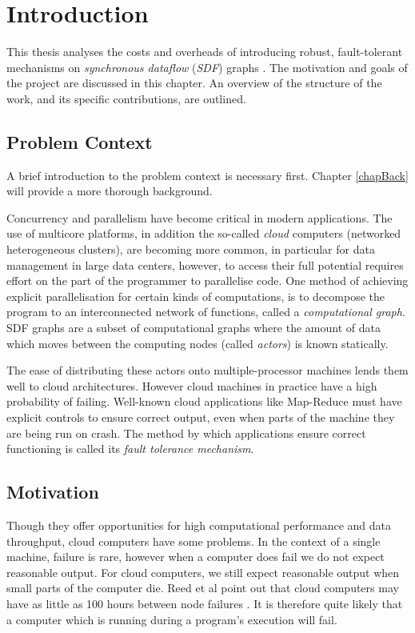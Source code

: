 \chapter{Introduction}

This thesis analyses the costs and overheads of introducing robust, fault-tolerant mechanisms on {\em synchronous dataflow} ({\em SDF}) graphs \cite{sdfBook}.
The motivation and goals of the project are discussed in this chapter.
An overview of the structure of the work, and its specific contributions, are outlined.

\section{Problem Context}

A brief introduction to the problem context is necessary first.
Chapter \ref{chapBack} will provide a more thorough background.

Concurrency and parallelism have become critical in modern applications.
The use of multicore platforms, in addition the so-called {\em cloud} computers (networked heterogeneous clusters), are becoming more common, in particular for data management in large data centers, however, to access their full potential requires effort on the part of the programmer to parallelise code.
One method of achieving explicit parallelisation for certain kinds of computations, is to decompose the program to an interconnected network of functions, called a {\em computational graph}.
SDF graphs are a subset of computational graphs where the amount of data which moves between the computing nodes (called {\em actors}) is known statically.

The ease of distributing these actors onto multiple-processor machines lends them well to cloud architectures.
However cloud machines in practice have a high probability of failing.
Well-known cloud applications like Map-Reduce \cite{dea08} must have explicit controls to ensure correct output, even when parts of the machine they are being run on crash.
The method by which applications ensure correct functioning is called its {\em fault tolerance mechanism}.

\section{Motivation}

Though they offer opportunities for high computational performance and data throughput, cloud computers have some problems.
In the context of a single machine, failure is rare, however when a computer does fail we do not expect reasonable output.
For cloud computers, we still expect reasonable output when small parts of the computer die.
Reed et al point out that cloud computers may have as little as 100 hours between node failures \cite{ree06}.
It is therefore quite likely that a computer which is running during a program's execution will fail.


